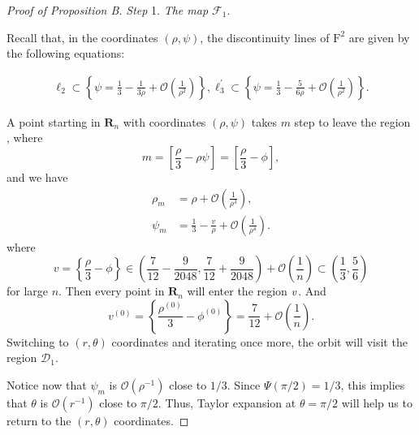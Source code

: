 \documentclass{article}
\def \Rfive{\uppercase\expandafter{\romannumeral5}}
\numberwithin{figure}{section}
\numberwithin{equation}{section}
\theoremstyle{remark}
\theoremstyle{definition}
\begin{document}
\begin{proof}[Proof of Proposition B]
        \emph{Step} 1. \emph{The map $\mathcal{F}_1$}. 
        
        Recall that, in the coordinates \((\rho,\psi)\), the discontinuity lines of \(\text{F}^{\text{2}}\) are
given by the following equations:
	
	\begin{align}
		\ell_{2} \subset \left\{ \psi = \frac{1}{3} - \frac{1}{3\rho} + \mathcal{O}\left( \frac{1}{\rho^{2}} \right) \right\},
		\ell_{3}^{'} \subset \left\{ \psi = \frac{1}{3} - \frac{5}{6\rho} + \mathcal{O}\left( \frac{1}{\rho^{2}} \right) \right\}.
	\end{align}
	
	A point starting in $\mathbf{R}_n$
	with coordinates \((\rho,\psi)\) takes \(m\) step to leave the region
	\emph{\uppercase\expandafter{}}, where
	\begin{equation}
		m = \left\lbrack \frac{\rho}{3} - \rho\psi \right\rbrack=\left\lbrack \frac{\rho}{3} - \phi \right\rbrack,
	\end{equation}
     and we have
	\begin{equation}\label{cross1}
		\begin{split}
			\rho_{m} &= \rho + \mathcal{O}\left( \frac{1}{\rho^{3}} \right),\\
			\psi_{m} &= \frac{1}{3} - \frac{v}{\rho} + \mathcal{O}\left( \frac{1}{\rho^{4}} \right).
		\end{split}
	\end{equation}
    where 
    \begin{equation}\label{initialv}
         v=\left\{\frac{\rho}{3}-\phi\right\}\in\left(\frac{7}{12}-\frac{9}{2048},\frac{7}{12}+\frac{9}{2048}\right)+\mathcal{O}\left(\frac{1}{n}\right)\subset\left(\frac{1}{3},\frac{5}{6}\right)
    \end{equation}
    for large $n$. Then every point in $\mathbf{R}_n$ will enter the region $\Rfive$. And 
    \begin{equation}\label{initialv0}
         v^{(0)}=\left\{\frac{\rho^{(0)}}{3}-\phi^{(0)}\right\}=\frac{7}{12}+\mathcal{O}\left(\frac{1}{n}\right).
    \end{equation}
    Switching to $(r,\theta)$ coordinates and iterating once more, the orbit will visit the region $\mathcal{D}_1$. {\color{red} Notice now that $\psi_m$ is $\mathcal{O}(\rho^{-1})$ close to $1/3$. Since $\Psi(\pi/2)=1/3$, this implies that $\theta$ is $\mathcal{O}(r^{-1})$ close to $\pi/2$. Thus, Taylor expansion at $\theta=\pi/2$ will help us to return to the $(r,\theta)$ coordinates.

}
\end{proof}
\end{document}
